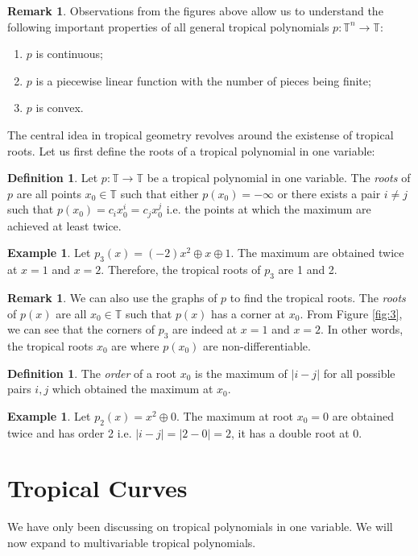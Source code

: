 \documentclass[]{article}
\theoremstyle{definition}
\numberwithin{equation}{section}
\newtheorem{defn}[thm]{Definition}
\newtheorem{examp}[thm]{Example}
\newtheorem{rmk}[thm]{Remark}
\renewcommand{\.}{\,.}
\begin{document}
\begin{rmk}\label{remark}
Observations from the figures above allow us to understand the following important properties of all general tropical polynomials $p: \mathbb{T}^n\to\mathbb{T}$:
	  \begin{enumerate}[noitemsep,topsep=-5pt]
	  	\item $p$ is continuous;
	  	\item $p$ is a piecewise linear function with the number of pieces being finite;
	  	\item $p$ is convex.
	  \end{enumerate}
\end{rmk}
\hspace*{3mm} The central idea in tropical geometry revolves around the existense of tropical roots. Let us first define the roots of a tropical polynomial in one variable:
\begin{defn} Let $p: \mathbb{T}\to\mathbb{T}$ be a tropical polynomial in one variable. The \emph{roots} of $p$ are all points $x_0 \in \mathbb{T}$ such that either $p(x_0)=-\infty$ or there exists a pair $i\neq j$ such that $p(x_0)=c_ix^i_0=c_jx^j_0$ i.e. the points at which the maximum are achieved at least twice.
	\end{defn}
\begin{examp}
	Let $p_3(x)=(-2)x^2\oplus x \oplus 1$. The maximum are obtained twice at $x=1$ and $x=2$. Therefore, the tropical roots of $p_3$ are 1 and 2.
\end{examp}
	\begin{rmk}
	We can also use the graphs of $p$ to find the tropical roots. The \emph{roots} of $p(x)$ are all $x_0 \in \mathbb{T}$ such that $p(x)$ has a corner at $x_0$. From Figure \ref{fig:3}, we can see that the corners of $p_3$ are indeed at $x=1$ and $x=2$. In other words, the tropical roots $x_0$ are where $p(x_0)$ are non-differentiable.
\end{rmk}
\begin{defn}
	The \emph{order} of a root $x_0$ is the maximum of $|i-j|$ for all possible pairs $i,j$ which obtained the maximum at $x_0$.
\end{defn}
\begin{examp}
	Let $p_2(x)=x^2 \oplus 0$. The maximum at root $x_0=0$ are obtained twice and has order 2 i.e.  $|i-j|=|2-0|=2$, it has a double root at $0$.
\end{examp}


	\newpage

\section{Tropical Curves}
\hspace{3mm} We have only been discussing on tropical polynomials in one variable. We will now expand to multivariable tropical polynomials.
\end{document}
